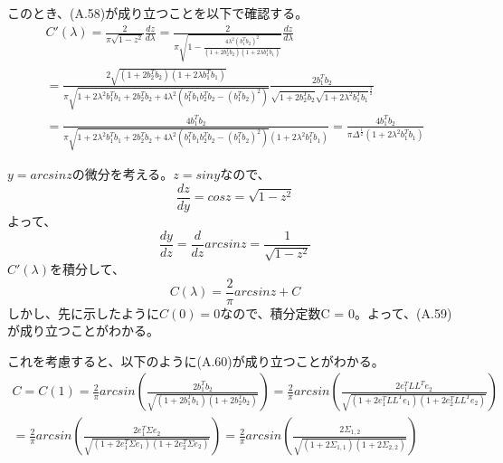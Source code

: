 \documentclass{jsarticle}
\begin{document}
このとき、(A.58)が成り立つことを以下で確認する。
\begin{equation}
\begin{split}
C'(\lambda) = \frac{2}{\pi \sqrt{1 - z^2}}\frac{dz}{d\lambda}
= \frac{2}{\pi \sqrt{1 - \frac{4\lambda^2 (b_1^T b_2)^2}{(1 + 2b_2^T b_2)(1 + 2\lambda b_1^T b_1)}}}\frac{dz}{d\lambda}\\
= \frac{2\sqrt{(1 + 2b_2^T b_2)(1 + 2\lambda b_1^T b_1)}}{\pi \sqrt{1 + 2\lambda^2 b_1^T b_1 + 2b_2^T b_2 + 4\lambda^2(b_1^T b_1 b_2^T b_2 - (b_1^T b_2)^2)}}\frac{2 b_1^T b_2}{\sqrt{1 + 2b_2^T b_2}\sqrt{1 + 2\lambda^2 b_1^T b_1}^{\frac{3}{2}}}\\
= \frac{4 b_1^T b_2}{\pi \sqrt{1 + 2\lambda^2 b_1^T b_1 + 2b_2^T b_2 + 4\lambda^2(b_1^T b_1 b_2^T b_2 - (b_1^T b_2)^2)}(1 + 2\lambda^2 b_1^T b_1)}
= \frac{4 b_1^T b_2}{\pi \Delta^{\frac{1}{2}}(1 + 2\lambda^2 b_1^T b_1)}
\end{split}
\end{equation}

$y = arcsin z$の微分を考える。$z = sin y$なので、
\begin{equation}
\frac{dz}{dy} = cos z = \sqrt{1 - z^2}
\end{equation}
よって、
\begin{equation}
\frac{dy}{dz} = \frac{d}{dz} arcsin z = \frac{1}{\sqrt{1 - z^2}}
\end{equation}
$C'(\lambda)$を積分して、
\begin{equation}
C(\lambda) = \frac{2}{\pi} arcsin z + C
\end{equation}
しかし、先に示したように$C(0) = 0$なので、積分定数C = 0。よって、(A.59)が成り立つことがわかる。

これを考慮すると、以下のように(A.60)が成り立つことがわかる。
\begin{equation}
\begin{split}
C = C(1) = \frac{2}{\pi} arcsin (\frac{2 b_1^T b_2}{\sqrt{(1 + 2 b_1^T b_1)(1 + 2b_2^T b_2)}})
= \frac{2}{\pi} arcsin (\frac{2 e_1^T L L^T e_2}{\sqrt{(1 + 2 e_1^T L L^T e_1)(1 + 2e_2^T L L^T e_2)}})\\
= \frac{2}{\pi} arcsin (\frac{2 e_1^T \Sigma e_2}{\sqrt{(1 + 2 e_1^T \Sigma e_1)(1 + 2e_2^T \Sigma e_2)}})
= \frac{2}{\pi} arcsin (\frac{2 \Sigma_{1, 2}}{\sqrt{(1 + 2 \Sigma_{1, 1})(1 + 2\Sigma_{2, 2})}})
\end{split}
\end{equation}
\end{document}

